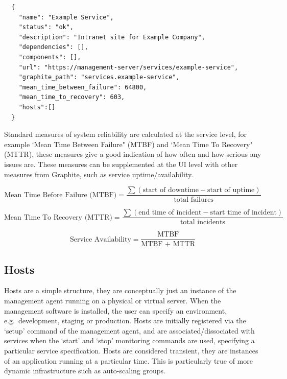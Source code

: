 \documentclass{cshonours}
\begin{document}
\begin{listing}[h]
\begin{verbatim}
  {
    "name": "Example Service",
    "status": "ok",
    "description": "Intranet site for Example Company",
    "dependencies": [],
    "components": [],
    "url": "https://management-server/services/example-service",
    "graphite_path": "services.example-service",
    "mean_time_between_failure": 64800,
    "mean_time_to_recovery": 603,
    "hosts":[]
  }
\end{verbatim}
\end{listing}

Standard measures of system reliability are calculated at the service level, for example `Mean Time Between Failure" (MTBF) and `Mean Time To Recovery" (MTTR), these measures give a good indication of how often and how serious any issues are. These measures can be supplemented at the UI level with other measures from Graphite, such as service uptime/availability.

\begin{equation}
  \mbox{Mean Time Before Failure (MTBF)}= \frac{\sum{(\mbox{start of downtime} - \mbox{start of uptime})}}{\mbox{total failures}}
\end{equation}

\begin{equation}
  \mbox{Mean Time To Recovery (MTTR)}= \frac{\sum{(\mbox{end time of incident} - \mbox{start time of incident})}}{\mbox{total incidents}}
\end{equation}

\begin{equation}
  \mbox{Service Availability}= \frac{\mbox{MTBF}}{\mbox{MTBF + MTTR}}
\end{equation}

\pagebreak
\subsection{Hosts}
Hosts are a simple structure, they are conceptually just an instance of the management agent running on a physical or virtual server. When the management software is installed, the user can specify an environment, e.g.\ development, staging or production. Hosts are initially registered via the `setup' command of the management agent, and are associated/dissociated with services when the `start' and `stop' monitoring commands are used, specifying a particular service specification. Hosts are considered transient, they are instances of an application running at a particular time. This is particularly true of more dynamic infrastructure such as auto-scaling groups.
\end{document}

